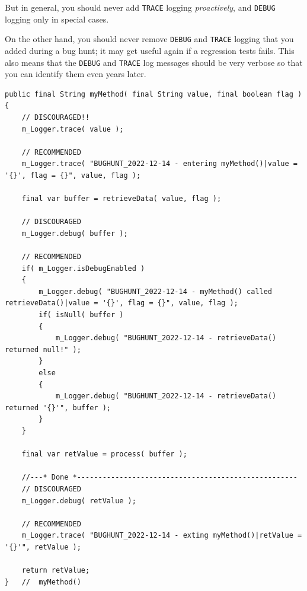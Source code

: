 \documentclass[11pt,a4paper, titlepage, parskip=half, headsepline, footsepline, cleardoublepage=current, headheight=1cm]{scrbook}
\begin{document}
But in general, you should never add \verb#TRACE# logging \textit{proactively}, and \verb#DEBUG# logging only in special cases.

On the other hand, you should never remove \verb#DEBUG# and \verb#TRACE# logging that you added during a bug hunt; it may get useful again if a regression tests fails. This also means that the \verb#DEBUG# and \verb#TRACE# log messages should be very verbose so that you can identify them even years later.
\begin{lstlisting}
public final String myMethod( final String value, final boolean flag )
{
    // DISCOURAGED!!
    m_Logger.trace( value );
    
    // RECOMMENDED
    m_Logger.trace( "BUGHUNT_2022-12-14 - entering myMethod()|value = '{}', flag = {}", value, flag );
    
    final var buffer = retrieveData( value, flag );
    
    // DISCOURAGED
    m_Logger.debug( buffer );
    
    // RECOMMENDED
    if( m_Logger.isDebugEnabled )
    {
        m_Logger.debug( "BUGHUNT_2022-12-14 - myMethod() called retrieveData()|value = '{}', flag = {}", value, flag );
        if( isNull( buffer )
        {
            m_Logger.debug( "BUGHUNT_2022-12-14 - retrieveData() returned null!" );
        }
        else
        {
            m_Logger.debug( "BUGHUNT_2022-12-14 - retrieveData() returned '{}'", buffer );
        }
    }
    
    final var retValue = process( buffer );
    
    //---* Done *----------------------------------------------------
    // DISCOURAGED
    m_Logger.debug( retValue );
    
    // RECOMMENDED
    m_Logger.trace( "BUGHUNT_2022-12-14 - exting myMethod()|retValue = '{}'", retValue );
    
    return retValue;
}   //  myMethod()
\end{lstlisting}
\end{document}
